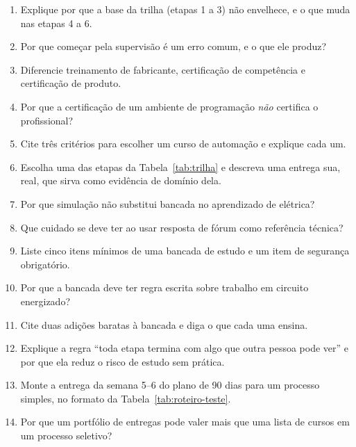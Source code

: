 \begin{exercicios}
\begin{enumerate}[label=\alph*)]
  \item Explique por que a base da trilha (etapas 1 a 3) não envelhece, e o que muda nas etapas 4 a 6.
  \item Por que começar pela supervisão é um erro comum, e o que ele produz?
  \item Diferencie treinamento de fabricante, certificação de competência e certificação de produto.
  \item Por que a certificação de um ambiente de programação \emph{não} certifica o profissional?
  \item Cite três critérios para escolher um curso de automação e explique cada um.
  \item Escolha uma das etapas da Tabela~\ref{tab:trilha} e descreva uma entrega sua, real, que sirva
        como evidência de domínio dela.
  \item Por que simulação não substitui bancada no aprendizado de elétrica?
  \item Que cuidado se deve ter ao usar resposta de fórum como referência técnica?
  \item Liste cinco itens mínimos de uma bancada de estudo e um item de segurança obrigatório.
  \item Por que a bancada deve ter regra escrita sobre trabalho em circuito energizado?
  \item Cite duas adições baratas à bancada e diga o que cada uma ensina.
  \item Explique a regra ``toda etapa termina com algo que outra pessoa pode ver'' e por que ela
        reduz o risco de estudo sem prática.
  \item Monte a entrega da semana 5--6 do plano de 90 dias para um processo simples, no formato da
        Tabela~\ref{tab:roteiro-teste}.
  \item Por que um portfólio de entregas pode valer mais que uma lista de cursos em um processo
        seletivo?
\end{enumerate}
\end{exercicios}
